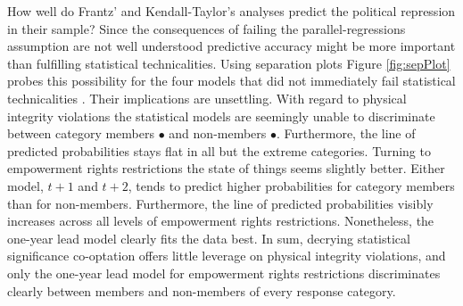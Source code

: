 How well do Frantz' and Kendall-Taylor's analyses predict 
the political repression in their sample? Since the 
consequences of failing the parallel-regressions
assumption are not well understood predictive accuracy might 
be more important than fulfilling statistical technicalities.
Using separation plots Figure \ref{fig:sepPlot} probes this
possibility for the four models that did not immediately 
fail statistical technicalities \citep{Greenhill.2011}.
Their implications are unsettling. With regard to 
physical integrity violations the statistical models are 
seemingly unable to discriminate between category 
members {\color{darkgrey} $\bullet$} and 
non-members {\color{lightgrey} $\bullet$}. 
Furthermore, the line of predicted probabilities stays flat 
in all but the extreme categories. Turning to empowerment 
rights restrictions the state of things seems slightly 
better. Either model, $t+1$ and $t+2$, tends to predict 
higher probabilities for category members than for 
non-members. Furthermore, the line of predicted 
probabilities visibly increases across all levels of 
empowerment rights restrictions. Nonetheless, the one-year 
lead model clearly fits the data best. In sum, decrying 
statistical significance co-optation offers little leverage 
on physical integrity violations, and only the one-year lead 
model for empowerment rights restrictions discriminates 
clearly between members and non-members of every response 
category.


